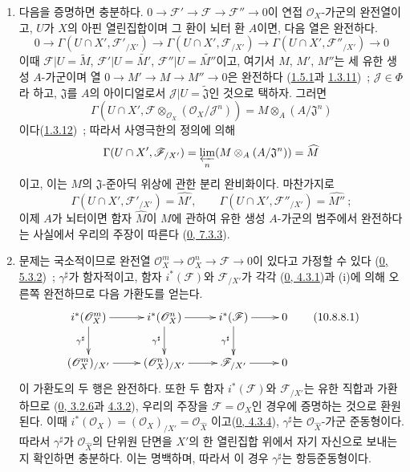 \medskip\noindent
\begin{enumerate}
  \item[\rm{(i)}] 다음을 증명하면 충분하다.
    $0\to\mathscr{F}'\to\mathscr{F}\to\mathscr{F}''\to0$이 연접
    $\mathscr{O}_X$-가군의 완전열이고, $U$가 $X$의 아핀 열린집합이며
    그 환이 뇌터 환 $A$이면, 다음 열은 완전하다.
    \[
      0\to\Gamma(U\cap X',\mathscr{F}'_{/X'})
      \to\Gamma(U\cap X',\mathscr{F}_{/X'})
      \to\Gamma(U\cap X',\mathscr{F}''_{/X'})\to0
    \]
    이때 $\mathscr{F}|U=\widetilde M$,
    $\mathscr{F}'|U=\widetilde{M'}$, $\mathscr{F}''|U=\widetilde{M''}$이고,
    여기서 $M$, $M'$, $M''$는 세 유한 생성 $A$-가군이며 열
    $0\to M'\to M\to M''\to0$은 완전하다
    (\hyperref[I.1.5.1-ko]{1.5.1}과
    \hyperref[I.1.3.11-ko]{1.3.11})~; $\mathscr{J}\in\Phi$라 하고,
    $\mathfrak{J}$를 $A$의 아이디얼로서
    $\mathscr{J}|U=\widetilde{\mathfrak{J}}$인 것으로 택하자. 그러면
    \[
      \Gamma(U\cap X',
      \mathscr{F}\otimes_{\mathscr{O}_X}(\mathscr{O}_X/\mathscr{J}^n))
      =M\otimes_A(A/\mathfrak{J}^n)
    \]
    이다(\hyperref[I.1.3.12-ko]{1.3.12})~; 따라서 사영극한의 정의에 의해
    \[
      \Gamma(U\cap X',\mathscr{F}_{/X'})
      =\varprojlim_n(M\otimes_A(A/\mathfrak{J}^n))=\widehat M
    \]
    이고, 이는 $M$의 $\mathfrak{J}$-준아딕 위상에 관한 분리
    완비화이다. 마찬가지로
    \[
      \Gamma(U\cap X',\mathscr{F}'_{/X'})=\widehat{M'},\qquad
      \Gamma(U\cap X',\mathscr{F}''_{/X'})=\widehat{M''}~;
    \]
    이제 $A$가 뇌터이면 함자 $\widehat M$이 $M$에 관하여 유한 생성
    $A$-가군의 범주에서 완전하다는 사실에서 우리의 주장이 따른다
    (\hyperref[0.7.3.3-ko]{0, 7.3.3}).

  \item[\rm{(ii)}] 문제는 국소적이므로 완전열
    $\mathscr{O}_X^m\to\mathscr{O}_X^n\to\mathscr{F}\to0$이
    있다고 가정할 수 있다
    (\hyperref[0.5.3.2-ko]{0, 5.3.2})~; $\gamma^\sharp$가 함자적이고,
    함자 $i^*(\mathscr{F})$와 $\mathscr{F}_{/X'}$가 각각
    (\hyperref[0.4.3.1-ko]{0, 4.3.1})과 (i)에 의해 오른쪽 완전하므로
    다음 가환도를 얻는다.
    \[
      \xymatrix{
        i^*(\mathscr{O}_X^m)\ar[r]\ar[d]_{\gamma^\sharp} &
        i^*(\mathscr{O}_X^n)\ar[r]\ar[d]_{\gamma^\sharp} &
        i^*(\mathscr{F})\ar[r]\ar[d]_{\gamma^\sharp} &
        0\\
        (\mathscr{O}_X^m)_{/X'}\ar[r] &
        (\mathscr{O}_X^n)_{/X'}\ar[r] &
        \mathscr{F}_{/X'}\ar[r] &
        0
      }
      \tag{10.8.8.1}\label{I.10.8.8.1-ko}
    \]
    이 가환도의 두 행은 완전하다. 또한 두 함자
    $i^*(\mathscr{F})$와 $\mathscr{F}_{/X'}$는 유한 직합과 가환하므로
    (\hyperref[0.3.2.6-ko]{0, 3.2.6}과
    \hyperref[0.4.3.2-ko]{4.3.2}), 우리의 주장을
    $\mathscr{F}=\mathscr{O}_X$인 경우에 증명하는 것으로 환원된다.
    이때
    $i^*(\mathscr{O}_X)=(\mathscr{O}_X)_{/X'}=
    \mathscr{O}_{\widehat X}$
    이고(\hyperref[0.4.3.4-ko]{0, 4.3.4}), $\gamma^\sharp$는
    $\mathscr{O}_{\widehat X}$-가군 준동형이다. 따라서
    $\gamma^\sharp$가 $\mathscr{O}_{\widehat X}$의 단위원 단면을
    $X'$의 한 열린집합 위에서 자기 자신으로 보내는지 확인하면 충분하다.
    이는 명백하며, 따라서 이 경우 $\gamma^\sharp$는 항등준동형이다.
\end{enumerate}

